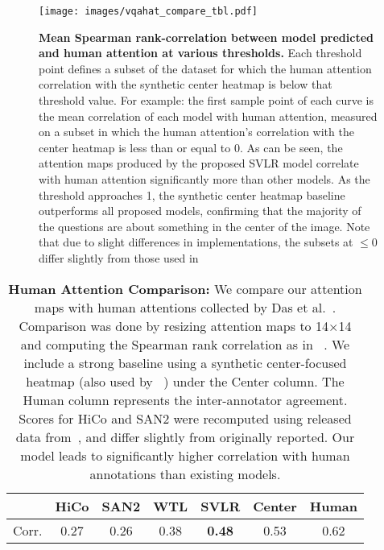 \begin{figure}                                  
  \centering                                                                        
  \texttt{[image: images/vqahat\_compare\_tbl.pdf]}  
  \caption{\textbf{Mean Spearman rank-correlation between model
      predicted and human attention at various thresholds.} Each
      threshold point defines a subset of the dataset for
      which the human attention correlation with the synthetic center
      heatmap is below that threshold value. For example: the first sample
      point of each curve is the mean correlation of each model with
      human attention, measured on a subset in which the human
      attention's correlation with the center heatmap is
      less than or equal to 0. As can
    be seen, the attention maps produced by the proposed SVLR model correlate with human attention significantly more than other models. As the threshold
    approaches 1, the synthetic center heatmap baseline outperforms
    all proposed models, confirming that the majority of the questions
    are about something in the center of the image. Note that due to slight differences in implementations, the subsets at $\le 0$ differ slightly from those used in \cite{das2016human}}
  \label{fig:vqahat_comparison}                                                                                                     
\end{figure}                 
%
\begin{table}
\setlength{\tabcolsep}{3 pt}
\small
    \centering
    \footnotesize
    \begin{tabular}{|c|c|c|c|c||c|c|}
        \hline
         & HiCo\cite{lu2016hierarchical} & SAN2\cite{yang2015stacked}& WTL\cite{shih2016look} & SVLR & Center & Human \\
         \hline
         Corr.& 0.27 & 0.26 & 0.38 & \textbf{0.48} & 0.53 &0.62\\
         \hline
    \end{tabular}
    \vspace{-1em}
    \caption{\textbf{Human Attention Comparison:} We compare our attention maps with human attentions collected by Das et al.~\cite{das2016human}. Comparison was done by resizing attention maps to 14$\times$14 and computing the Spearman rank correlation as in ~\cite{das2016human}. We include a strong baseline using a synthetic center-focused heatmap (also used by ~\cite{das2016human}) under the Center column. The Human column represents the inter-annotator agreement. Scores for HiCo and SAN2 were recomputed using released data from~\cite{das2016human}, and differ slightly from originally reported. Our model leads to significantly higher correlation with human annotations than existing models.}
    \label{tbl:vqahat}
    \vspace{-2em}
\end{table}

